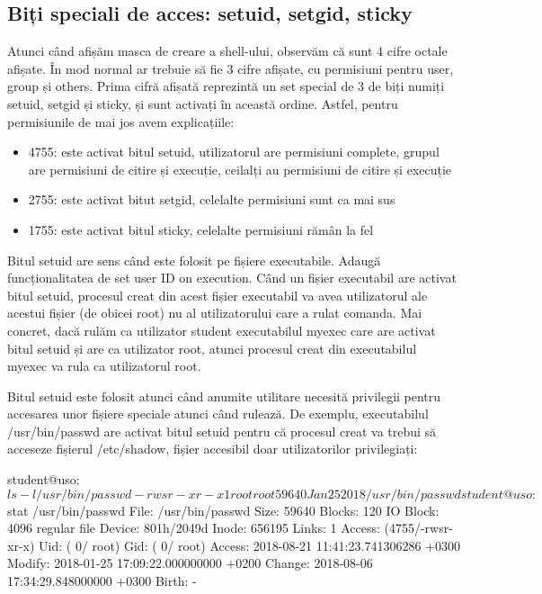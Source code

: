 \subsection{Biți speciali de acces: setuid, setgid, sticky}
\label{sec:users-fs-perms-special}

Atunci când afișăm masca de creare a shell-ului, observăm că sunt 4 cifre octale
afișate. În mod normal ar trebuie să fie 3 cifre afișate, cu permisiuni pentru
user, group și others. Prima cifră afișată reprezintă un set special de 3 de
biți numiți setuid, setgid și sticky, și sunt activați în această ordine.
Astfel, pentru permisiunile de mai jos avem explicațiile:

\begin{itemize}
	\item 4755: este activat bitul setuid, utilizatorul are permisiuni
		complete, grupul are permisiuni de citire și execuție, ceilalți
		au permisiuni de citire și execuție
	\item 2755: este activat bitut setgid, celelalte permisiuni sunt ca mai
		sus
	\item 1755: este activat bitul sticky, celelalte permisiuni rămân la fel
\end{itemize}

Bitul setuid are sens când este folosit pe fișiere executabile. Adaugă
funcționalitatea de set user ID on execution. Când un fișier executabil are
activat bitul setuid, procesul creat din acest fișier executabil va avea
utilizatorul ale acestui fișier (de obicei root) nu al utilizatorului care a
rulat comanda. Mai concret, dacă rulăm ca utilizator student executabilul myexec
care are activat bitul setuid și are ca utilizator root, atunci procesul creat
din executabilul myexec va rula ca utilizatorul root.

Bitul setuid este folosit atunci când anumite utilitare necesită privilegii
pentru accesarea unor fișiere speciale atunci când rulează. De exemplu,
executabilul /usr/bin/passwd are activat bitul setuid pentru că procesul creat
va trebui să acceseze fișierul /etc/shadow, fișier accesibil doar utilizatorilor
privilegiați:

\begin{screen}
student@uso:~$ ls -l /usr/bin/passwd
-rwsr-xr-x 1 root root 59640 Jan 25  2018 /usr/bin/passwd
student@uso:~$ stat /usr/bin/passwd
  File: /usr/bin/passwd
  Size: 59640             Blocks: 120        IO Block: 4096   regular file
Device: 801h/2049d        Inode: 656195      Links: 1
Access: (4755/-rwsr-xr-x)  Uid: (    0/    root)   Gid: (    0/    root)
Access: 2018-08-21 11:41:23.741306286 +0300
Modify: 2018-01-25 17:09:22.000000000 +0200
Change: 2018-08-06 17:34:29.848000000 +0300
 Birth: -
\end{screen}

